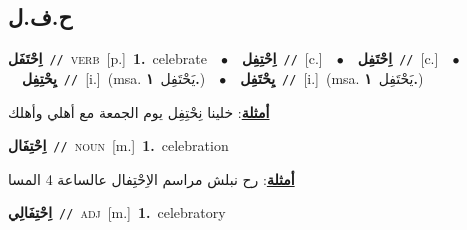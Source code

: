 \documentclass[10pt,a4paper,twoside]{article} %
\begin{document}
\begin{multicols}{2}
\vspace{-3mm}
\subsection*{\color{blue}\foreignlanguage{arabic}{ح.ف.ل}\color{blue}{}} 

{\setlength\topsep{0pt}\textbf{\foreignlanguage{arabic}{اِحْتَفَل}}\ {\color{gray}\texttt{//}\color{black}}\ \textsc{verb}\ [p.]\ \textbf{1.}~celebrate\ \ $\bullet$\ \ \setlength\topsep{0pt}\textbf{\foreignlanguage{arabic}{اِحْتِفِل}}\ {\color{gray}\texttt{//}\color{black}}\ [c.]\ \ $\bullet$\ \ \setlength\topsep{0pt}\textbf{\foreignlanguage{arabic}{اِحْتَفِل}}\ {\color{gray}\texttt{//}\color{black}}\ [c.]\ \ $\bullet$\ \ \setlength\topsep{0pt}\textbf{\foreignlanguage{arabic}{يِحْتِفِل}}\ {\color{gray}\texttt{//}\color{black}}\ [i.]\ \color{gray}(msa. \foreignlanguage{arabic}{يَحْتَفِل}~\foreignlanguage{arabic}{\textbf{١.}})\color{black}\ \ $\bullet$\ \ \setlength\topsep{0pt}\textbf{\foreignlanguage{arabic}{يِحْتَفِل}}\ {\color{gray}\texttt{//}\color{black}}\ [i.]\ \color{gray}(msa. \foreignlanguage{arabic}{يَحْتَفِل}~\foreignlanguage{arabic}{\textbf{١.}})\color{black}\  \begin{flushright}\color{gray}\foreignlanguage{arabic}{\textbf{\underline{\foreignlanguage{arabic}{أمثلة}}}: خلينا نِحْتِفِل يوم الجمعة مع أهلي وأهلك}\end{flushright}\color{black}} \vspace{2mm}

{\setlength\topsep{0pt}\textbf{\foreignlanguage{arabic}{اِحْتِفَال}}\ {\color{gray}\texttt{//}\color{black}}\ \textsc{noun}\ [m.]\ \textbf{1.}~celebration\  \begin{flushright}\color{gray}\foreignlanguage{arabic}{\textbf{\underline{\foreignlanguage{arabic}{أمثلة}}}: رح نبلش مراسم الاِحْتِفال عالساعة 4 المسا}\end{flushright}\color{black}} \vspace{2mm}

{\setlength\topsep{0pt}\textbf{\foreignlanguage{arabic}{اِحْتِفَالِي}}\ {\color{gray}\texttt{//}\color{black}}\ \textsc{adj}\ [m.]\ \textbf{1.}~celebratory\ } \vspace{2mm}


\end{multicols}
\end{document}

